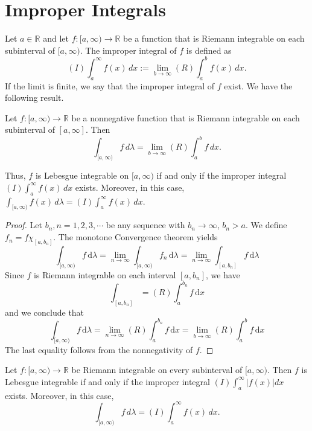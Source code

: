 \documentclass[../main.tex]{subfiles}
\begin{document}
\section{Improper Integrals}

\begin{definition}{}{}
    Let \(a \in \mathbb{R}\) and let \(f:[a,\infty)\to \mathbb{R}\) be a function that is Riemann integrable on each subinterval of \([a,\infty)\). The improper integral of \(f\) is defined as
\begin{equation}
(I)\int_{a}^{\infty} f(x)\,dx := \lim_{b\to\infty}(R)\int_{a}^{b} f(x)\,dx.
\end{equation}
If the limit  is finite, we say that the improper integral of \(f\) exist. We have the following result.
\end{definition}
\begin{theorem}{}
Let $f:[a,\infty) \to \mathbb{R}$ be a nonnegative function that is Riemann integrable on each subinterval of $[a,\infty]$. Then
\begin{equation}
\int_{[a,\infty)} f\,d\lambda = \lim_{b\to\infty}{(R)} \int_a^b f\,dx.
\end{equation}

Thus, $f$ is Lebesgue integrable on $[a,\infty)$ if and only if the improper integral $(I)\int_a^\infty f(x)\,dx$ exists. Moreover, in this case, $\int_{[a,\infty)} f(x)\,d\lambda = (I)\int_a^\infty f(x)\,dx$.
\end{theorem}

\begin{proof}
    Let \(  b_{n},  n =  1,2,3,\cdots   \) be any sequence with \(  b_{n}\to \infty  \), \(  b_{n}> a  \). We define \(  f_{n}= f \chi _{\left[ a,b_{n} \right] }  \). The monotone Convergence theorem yields \[
    \int_{[a,\infty)}f\,\mathrm{d}  \lambda = \lim_{n\to \infty}\int_{[a,\infty)}f_{n}\,\mathrm{d}  \lambda = \lim_{n\to \infty}\int_{[a,b_{n}]}f\,\mathrm{d}  \lambda 
    \]   Since \(  f  \) is Riemann integrable on each interval \(  \left[ a,b_{n} \right]   \), we have \[
    \int_{[a,b_{n}]}= \left( R \right)\int_{a}^{b_{n}}f\,\mathrm{d} x 
    \] and we conclude that \[
    \int_{[a,\infty)}f\,\mathrm{d}  \lambda = \lim_{n\to \infty}\left( R \right)\int_{a}^{b_{n}}f\,\mathrm{d} x = \lim_{b \to \infty} \left( R \right) \int_{a}^{b}f\,\mathrm{d} x
    \]  The last equality follows from the nonnegativity of \(  f  \). 
\end{proof}
\begin{theorem}{}{}
Let $f:[a,\infty)\to\mathbb{R}$ be Riemann integrable on every subinterval of $[a,\infty)$. Then $f$ is Lebesgue integrable if and only if the improper integral $(I)\int_{a}^{\infty}\lvert f(x)\rvert dx$ exists. Moreover, in this case,
\begin{equation}
\int_{[a,\infty)} f\,d\lambda=(I)\int_{a}^{\infty} f(x)\,dx.
\end{equation}
\end{theorem}
\end{document}
